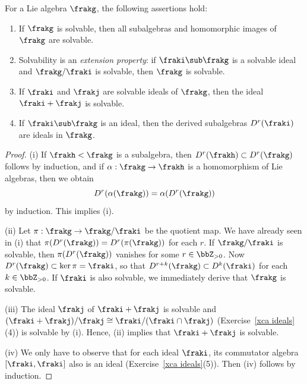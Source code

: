 \begin{prop}[{\cite[Prop.~5.4.3]{HN}}]\label{prop 5.4.3 HN}
    For a Lie algebra $\frakg$, the following assertions hold:
    \begin{enumerate}[label=(\roman*)]
        \item If $\frakg$ is solvable, then all subalgebras and homomorphic images of $\frakg$ are solvable.
        \item Solvability is an \emph{extension property}: if $\fraki\sub \frakg$ is a solvable ideal and $\frakg\slash\fraki$ is solvable, then $\frakg$ is solvable.
        \item If $\fraki$ and $\frakj$ are solvable ideals of $\frakg$, then the ideal $\fraki+\frakj$ is solvable.
        \item If $\fraki\sub \frakg$ is an ideal, then the derived subalgebras $D^r(\fraki)$ are ideals in $\frakg$.
    \end{enumerate}
\end{prop}
\begin{proof}
    (i) If $\frakh<\frakg$ is a subalgebra, then $D^r(\frakh)\subset D^r(\frakg)$ follows by induction, and if $\alpha:\frakg\to\frakh$ is a homomorphism of Lie algebras, then we obtain 
    \[D^r(\alpha(\frakg))=\alpha(D^r(\frakg))\]
    by induction. This implies (i).

    (ii) Let $\pi:\frakg\to\frakg\slash\fraki$ be the quotient map. We have already seen in (i) that $\pi(D^r(\frakg))=D^r(\pi(\frakg))$ for each $r$. If $\frakg\slash\fraki$ is solvable, then $\pi(D^r(\frakg))$ vanishes for some $r\in\bbZ_{>0}$. Now $D^r(\frakg)\subset\ker\pi=\fraki$, so that $D^{r+k}(\frakg)\subset D^k(\fraki)$ for each $k\in\bbZ_{>0}$. If $\fraki$ is also solvable, we immediately derive that $\frakg$ is solvable.

    (iii) The ideal $\frakj$ of $\fraki+\frakj$ is solvable and $(\fraki+\frakj)\slash\frakj\cong \fraki\slash(\fraki\cap\frakj)$ (Exercise~\ref{xca ideals}(4)) is solvable by (i). Hence, (ii) implies that $\fraki+\frakj$ is solvable.

    (iv) We only have to observe that for each ideal $\fraki$, its commutator algebra $[\fraki,\fraki]$ also is an ideal (Exercise~\ref{xca ideals}(5)). Then (iv) follows by induction.
\end{proof}

